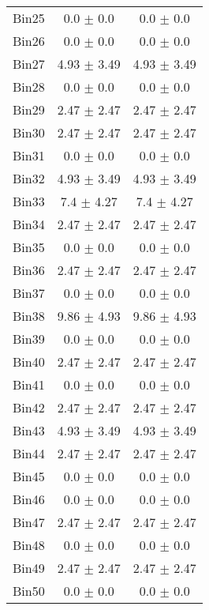 \begin{tabular}{|c|c|c|}
     Bin25 & 0.0 $\pm$ 0.0 & 0.0 $\pm$ 0.0 \\ \cline{1-3} 
     Bin26 & 0.0 $\pm$ 0.0 & 0.0 $\pm$ 0.0 \\ \cline{1-3} 
     Bin27 & 4.93 $\pm$ 3.49 & 4.93 $\pm$ 3.49 \\ \cline{1-3} 
     Bin28 & 0.0 $\pm$ 0.0 & 0.0 $\pm$ 0.0 \\ \cline{1-3} 
     Bin29 & 2.47 $\pm$ 2.47 & 2.47 $\pm$ 2.47 \\ \cline{1-3} 
     Bin30 & 2.47 $\pm$ 2.47 & 2.47 $\pm$ 2.47 \\ \cline{1-3} 
     Bin31 & 0.0 $\pm$ 0.0 & 0.0 $\pm$ 0.0 \\ \cline{1-3} 
     Bin32 & 4.93 $\pm$ 3.49 & 4.93 $\pm$ 3.49 \\ \cline{1-3} 
     Bin33 & 7.4 $\pm$ 4.27 & 7.4 $\pm$ 4.27 \\ \cline{1-3} 
     Bin34 & 2.47 $\pm$ 2.47 & 2.47 $\pm$ 2.47 \\ \cline{1-3} 
     Bin35 & 0.0 $\pm$ 0.0 & 0.0 $\pm$ 0.0 \\ \cline{1-3} 
     Bin36 & 2.47 $\pm$ 2.47 & 2.47 $\pm$ 2.47 \\ \cline{1-3} 
     Bin37 & 0.0 $\pm$ 0.0 & 0.0 $\pm$ 0.0 \\ \cline{1-3} 
     Bin38 & 9.86 $\pm$ 4.93 & 9.86 $\pm$ 4.93 \\ \cline{1-3} 
     Bin39 & 0.0 $\pm$ 0.0 & 0.0 $\pm$ 0.0 \\ \cline{1-3} 
     Bin40 & 2.47 $\pm$ 2.47 & 2.47 $\pm$ 2.47 \\ \cline{1-3} 
     Bin41 & 0.0 $\pm$ 0.0 & 0.0 $\pm$ 0.0 \\ \cline{1-3} 
     Bin42 & 2.47 $\pm$ 2.47 & 2.47 $\pm$ 2.47 \\ \cline{1-3} 
     Bin43 & 4.93 $\pm$ 3.49 & 4.93 $\pm$ 3.49 \\ \cline{1-3} 
     Bin44 & 2.47 $\pm$ 2.47 & 2.47 $\pm$ 2.47 \\ \cline{1-3} 
     Bin45 & 0.0 $\pm$ 0.0 & 0.0 $\pm$ 0.0 \\ \cline{1-3} 
     Bin46 & 0.0 $\pm$ 0.0 & 0.0 $\pm$ 0.0 \\ \cline{1-3} 
     Bin47 & 2.47 $\pm$ 2.47 & 2.47 $\pm$ 2.47 \\ \cline{1-3} 
     Bin48 & 0.0 $\pm$ 0.0 & 0.0 $\pm$ 0.0 \\ \cline{1-3} 
     Bin49 & 2.47 $\pm$ 2.47 & 2.47 $\pm$ 2.47 \\ \cline{1-3} 
     Bin50 & 0.0 $\pm$ 0.0 & 0.0 $\pm$ 0.0 \\ \cline{1-3} 

\end{tabular}
